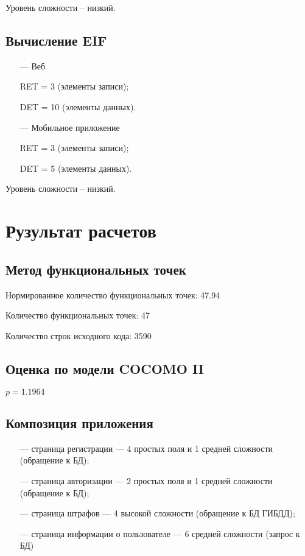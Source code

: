 Уровень сложности – низкий.

\subsection*{Вычисление EIF}

\begin{itemize}
    \item[---] Веб
    
    RET = 3 (элементы записи);
    
    DET = 10 (элементы данных).
    
    \item[---] Мобильное приложение
    
    RET = 3 (элементы записи);
    
    DET = 5 (элементы данных).
\end{itemize}

Уровень сложности – низкий.

\section{Рузультат расчетов}

\subsection{Метод функциональных точек}

Нормированное количество функциональных точек: 47.94

Количество функциональных точек: 47

Количество строк исходного кода: 3590


\clearpage

\subsection{Оценка по модели COCOMO II}

$p = 1.1964$


\subsection{Композиция приложения}

\begin{itemize}
    \item[---] страница регистрации --- 4 простых поля и 1 средней сложности (обращение к БД);
    \item[---] страница авторизации --- 2 простых поля и 1 средней сложности (обращение к БД);
    \item[---] страница штрафов --- 4 высокой сложности (обращение к БД ГИБДД);
    \item[---] страница информации о пользователе --- 6 средней сложности (запрос к БД)
\end{itemize}

